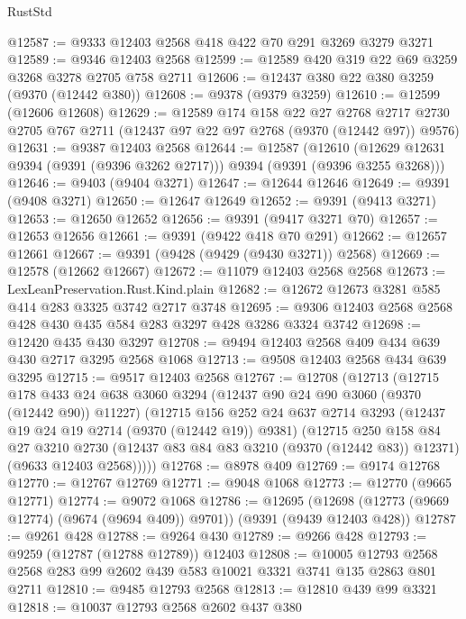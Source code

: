 \begin{lexlean}{RustStd}
\begin{coremodule}
@12587 := @9333 @12403 @2568 @418 @422 @70 @291 @3269 @3279 @3271
@12589 := @9346 @12403 @2568
@12599 := @12589 @420 @319 @22 @69 @3259 @3268 @3278 @2705 @758 @2711
@12606 := @12437 @380 @22 @380 @3259 (@9370 (@12442 @380))
@12608 := @9378 (@9379 @3259)
@12610 := @12599 (@12606 @12608)
@12629 := @12589
    @174
    @158
    @22
    @27
    @2768
    @2717
    @2730
    @2705
    @767
    @2711
    (@12437 @97 @22 @97 @2768 (@9370 (@12442 @97)) @9576)
@12631 := @9387 @12403 @2568
@12644 := @12587
    (@12610 (@12629 @12631 @9394 (@9391 (@9396 @3262 @2717))) @9394 (@9391 (@9396 @3255 @3268)))
@12646 := @9403 (@9404 @3271)
@12647 := @12644 @12646
@12649 := @9391 (@9408 @3271)
@12650 := @12647 @12649
@12652 := @9391 (@9413 @3271)
@12653 := @12650 @12652
@12656 := @9391 (@9417 @3271 @70)
@12657 := @12653 @12656
@12661 := @9391 (@9422 @418 @70 @291)
@12662 := @12657 @12661
@12667 := @9391 (@9428 (@9429 (@9430 @3271)) @2568)
@12669 := @12578 (@12662 @12667)
@12672 := @11079 @12403 @2568 @2568
@12673 := LexLeanPreservation.Rust.Kind.plain
@12682 := @12672 @12673 @3281 @585 @414 @283 @3325 @3742 @2717 @3748
@12695 := @9306 @12403 @2568 @2568 @428 @430 @435 @584 @283 @3297 @428 @3286 @3324 @3742
@12698 := @12420 @435 @430 @3297
@12708 := @9494 @12403 @2568 @409 @434 @639 @430 @2717 @3295 @2568 @1068
@12713 := @9508 @12403 @2568 @434 @639 @3295
@12715 := @9517 @12403 @2568
@12767 := @12708
    (@12713
      (@12715
        @178
        @433
        @24
        @638
        @3060
        @3294
        (@12437 @90 @24 @90 @3060 (@9370 (@12442 @90)) @11227)
        (@12715
          @156
          @252
          @24
          @637
          @2714
          @3293
          (@12437 @19 @24 @19 @2714 (@9370 (@12442 @19)) @9381)
          (@12715
            @250
            @158
            @84
            @27
            @3210
            @2730
            (@12437 @83 @84 @83 @3210 (@9370 (@12442 @83)) @12371)
            (@9633 @12403 @2568)))))
@12768 := @8978 @409
@12769 := @9174 @12768
@12770 := @12767 @12769
@12771 := @9048 @1068
@12773 := @12770 (@9665 @12771)
@12774 := @9072 @1068
@12786 := @12695
    (@12698 (@12773 (@9669 @12774) (@9674 (@9694 @409)) @9701))
    (@9391 (@9439 @12403 @428))
@12787 := @9261 @428
@12788 := @9264 @430
@12789 := @9266 @428
@12793 := @9259 (@12787 (@12788 @12789)) @12403
@12808 := @10005
    @12793
    @2568
    @2568
    @283
    @99
    @2602
    @439
    @583
    @10021
    @3321
    @3741
    @135
    @2863
    @801
    @2711
@12810 := @9485 @12793 @2568
@12813 := @12810 @439 @99 @3321
@12818 := @10037 @12793 @2568 @2602 @437 @380

\end{coremodule}
\end{lexlean}
